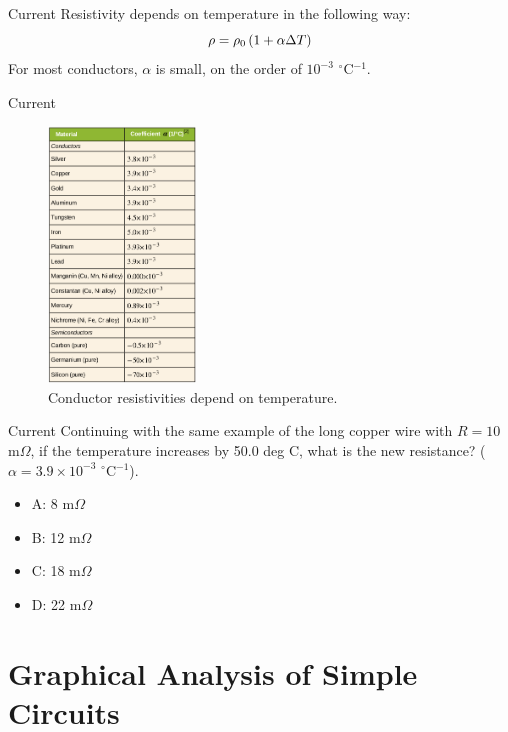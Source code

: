 \documentclass{beamer}
\begin{document}
\begin{frame}{Current}
Resistivity depends on temperature in the following way:
\begin{equation}
\rho = \rho_{\rm 0} \left(1 + \alpha \Delta T\right)
\end{equation}
For most conductors, $\alpha$ is small, on the order of $10^{-3}$ $^\circ$C$^{-1}$.
\end{frame}

\begin{frame}{Current}
\begin{figure}
\centering
\includegraphics[width=0.35\textwidth]{figures/rho3.png}
\caption{\label{fig:rho3} Conductor resistivities depend on temperature.}
\end{figure}
\end{frame}

\begin{frame}{Current}
Continuing with the same example of the long copper wire with $R = 10$ m$\Omega$, if the temperature increases by 50.0 deg C, what is the new resistance? ($\alpha = 3.9 \times 10^{-3}$ $^{\circ}$C$^{-1}$).
\begin{itemize}
\item A: 8 m$\Omega$
\item B: 12 m$\Omega$
\item C: 18 m$\Omega$
\item D: 22 m$\Omega$
\end{itemize}
\end{frame}

\section{Graphical Analysis of Simple Circuits}
\end{document}
